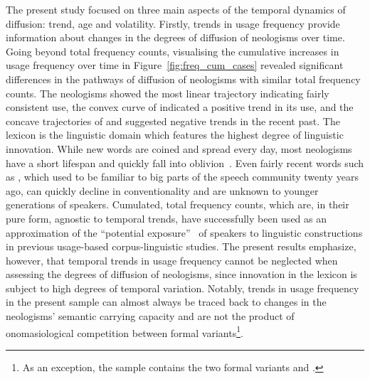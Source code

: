 \documentclass[
  a4paper,
  abstract=on,
  captions=tableabove
  ]{scrartcl}
\begin{document}
    The present study focused on three main aspects of the temporal dynamics of diffusion: trend, age and volatility. Firstly, trends in usage frequency provide information about changes in the degrees of diffusion of neologisms over time. Going beyond total frequency counts, visualising the cumulative increases in usage frequency over time in Figure~\ref{fig:freq_cum_cases} revealed significant differences in the pathways of diffusion of neologisms with similar total frequency counts. The neologisms  showed the most linear trajectory indicating fairly consistent use, the convex curve of  indicated a positive trend in its use, and the concave trajectories of  and  suggested negative trends in the recent past. The lexicon is the linguistic domain which features the highest degree of linguistic innovation. While new words are coined and spread every day, most neologisms have a short lifespan and quickly fall into oblivion~\parencite{Algeo1993DesuetudeNew}. Even fairly recent words such as , which used to be familiar to big parts of the speech community twenty years ago, can quickly decline in conventionality and are unknown to younger generations of speakers. Cumulated, total frequency counts, which are, in their pure form, agnostic to temporal trends, have successfully been used as an approximation of the \enquote{potential exposure}~\parencite{Stefanowitsch2017CorpusbasedPerspective} of speakers to linguistic constructions in previous usage-based corpus-linguistic studies. The present results emphasize, however, that temporal trends in usage frequency cannot be neglected when assessing the degrees of diffusion of neologisms, since innovation in the lexicon is subject to high degrees of temporal variation. Notably, trends in usage frequency in the present sample can almost always be traced back to changes in the neologisms' semantic carrying capacity and are not the product of onomasiological competition between formal variants\footnote{As an exception, the sample contains the two formal variants  and .}.
\end{document}
